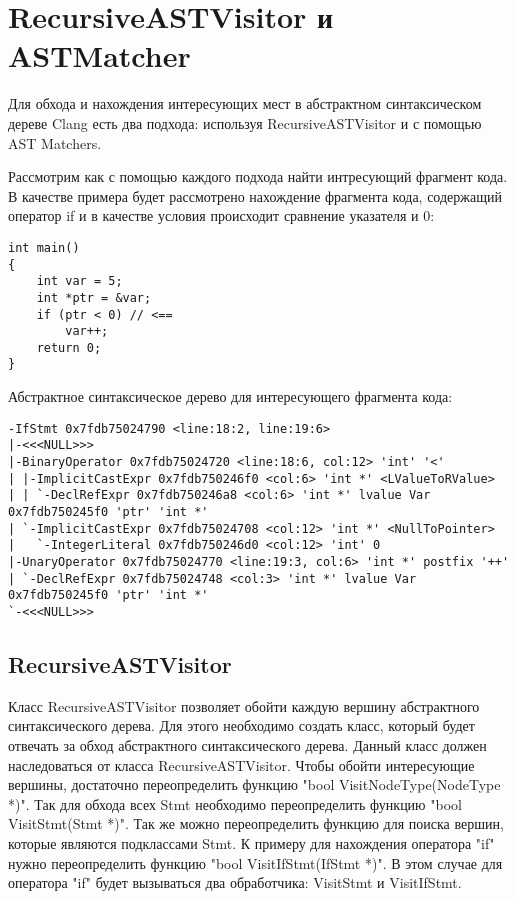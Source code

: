 \section{RecursiveASTVisitor и ASTMatcher}
Для обхода и нахождения интересующих мест в абстрактном синтаксическом дереве Clang есть два подхода:
используя RecursiveASTVisitor и с помощью AST Matchers.

Рассмотрим как с помощью каждого подхода найти интресующий фрагмент кода. В качестве примера
будет рассмотрено нахождение фрагмента кода, содержащий оператор if и в качестве условия 
происходит сравнение указателя и 0:
\begin{lstlisting}
int main()
{
	int var = 5;
	int *ptr = &var;
	if (ptr < 0) // <==
		var++;
	return 0;
}
\end{lstlisting}

Абстрактное синтаксическое дерево для интересующего фрагмента кода:
\begin{lstlisting}[basicstyle=\tiny]
-IfStmt 0x7fdb75024790 <line:18:2, line:19:6>
|-<<<NULL>>>
|-BinaryOperator 0x7fdb75024720 <line:18:6, col:12> 'int' '<'
| |-ImplicitCastExpr 0x7fdb750246f0 <col:6> 'int *' <LValueToRValue>
| | `-DeclRefExpr 0x7fdb750246a8 <col:6> 'int *' lvalue Var 0x7fdb750245f0 'ptr' 'int *'
| `-ImplicitCastExpr 0x7fdb75024708 <col:12> 'int *' <NullToPointer>
|   `-IntegerLiteral 0x7fdb750246d0 <col:12> 'int' 0
|-UnaryOperator 0x7fdb75024770 <line:19:3, col:6> 'int *' postfix '++'
| `-DeclRefExpr 0x7fdb75024748 <col:3> 'int *' lvalue Var 0x7fdb750245f0 'ptr' 'int *'
`-<<<NULL>>>
\end{lstlisting}

\subsection*{RecursiveASTVisitor}
Класс RecursiveASTVisitor позволяет обойти каждую вершину абстрактного синтаксического дерева.
Для этого необходимо создать класс, который будет отвечать за обход абстрактного синтаксического 
дерева. Данный класс должен наследоваться от класса RecursiveASTVisitor. Чтобы обойти интересующие вершины,
достаточно переопределить функцию "bool VisitNodeType(NodeType *)". Так для обхода всех Stmt 
необходимо переопределить функцию "bool VisitStmt(Stmt *)". Так же можно переопределить функцию
для поиска вершин, которые являются подклассами Stmt. К примеру для нахождения оператора "if"
нужно переопределить функцию "bool VisitIfStmt(IfStmt *)". В этом случае для оператора "if" 
будет вызываться два обработчика: VisitStmt и VisitIfStmt.


